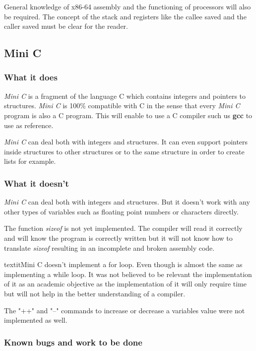 \documentclass[conference]{IEEEtran}
\theoremstyle{definition}
\begin{document}
General knowledge of x86-64 assembly and the functioning of processors will also be required. The concept of the stack and registers like the callee saved and the caller saved must be clear for the reader.

\subsection{Mini C}
\subsubsection{What it does}
\textit{Mini C} is a fragment of the language C which contains integers and pointers to structures. \textit{Mini C} is 100\% compatible with C in the sense that every \textit{Mini C} program is also a C program. This will enable to use a C compiler such us \textbf{gcc} to use as reference. 

\textit{Mini C} can deal both with integers and structures. It can even support pointers inside structures to other structures or to the same structure in order to create lists for example. 

\subsubsection{What it doesn't}
\textit{Mini C} can deal both with integers and structures. But it doesn't work with any other types of variables such as floating point numbers or characters directly.

The function \textit{sizeof} is not yet implemented. The compiler will read it correctly and will know the program is correctly written but it will not know how to translate \textit{sizeof} resulting in an incomplete and broken assembly code.  

textit{Mini C} doesn't implement a for loop. Even though is almost the same as implementing a while loop. It was not believed to be relevant the implementation of it as an academic objective as the implementation of it will only require time but will not help in the better understanding of a compiler.

The "++" and "--" commands to increase or decrease a variables value were not implemented as well.

\subsubsection{Known bugs and work to be done} 
\end{document}
